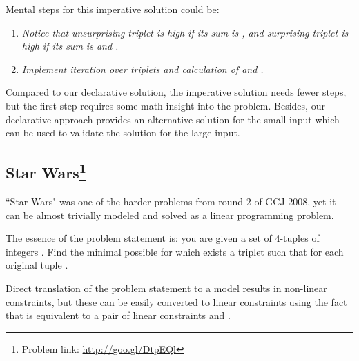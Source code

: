 \documentclass{acm_proc_article-sp}
\begin{document}
Mental steps for this imperative solution could be:

\begin{enumerate}
\item \textit{Notice that unsurprising triplet is high if its sum is , and surprising triplet is high if its sum is  and .}
\item \textit{Implement iteration over triplets and calculation of  and .}
\end{enumerate}

Compared to our declarative solution, the imperative solution needs fewer steps, but the first step requires some math insight into the problem.
Besides, our declarative approach provides an alternative solution for the small input which can be used to validate the solution for the large input.

\subsection*{Star Wars\footnote{Problem link: \url{http://goo.gl/DtpEQl}}}
``Star Wars" was one of the harder problems from round 2 of GCJ 2008, yet it can be almost trivially modeled and solved as a linear programming problem.

The essence of the problem statement is: you are given a set of  4-tuples of integers . Find the minimal possible  for which exists a triplet  such that 
for each original tuple .

Direct translation of the problem statement to a model results in non-linear constraints,
but these can be easily converted to linear constraints using the fact that  is equivalent to a pair of linear constraints  and  \cite{lpsolve-abs}.
\end{document}
